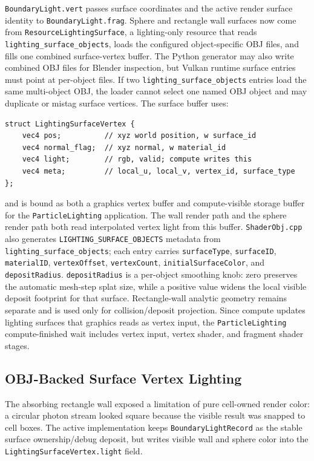 \texttt{BoundaryLight.vert} passes surface coordinates and the active render
surface identity to \texttt{BoundaryLight.frag}.  Sphere and rectangle wall
surfaces now come from \texttt{ResourceLightingSurface}, a lighting-only
resource that reads \texttt{lighting\_surface\_objects}, loads the configured
object-specific OBJ files, and fills one combined surface-vertex buffer.  The
Python generator may also write combined OBJ files for Blender inspection, but
Vulkan runtime surface entries must point at per-object files.  If two
\texttt{lighting\_surface\_objects} entries load the same multi-object OBJ,
the loader cannot select one named OBJ object and may duplicate or mistag
surface vertices.  The surface buffer uses:
\begin{verbatim}
struct LightingSurfaceVertex {
    vec4 pos;          // xyz world position, w surface_id
    vec4 normal_flag;  // xyz normal, w material_id
    vec4 light;        // rgb, valid; compute writes this
    vec4 meta;         // local_u, local_v, vertex_id, surface_type
};
\end{verbatim}
and is bound as both a graphics vertex buffer and compute-visible storage
buffer for the \texttt{ParticleLighting} application.  The wall render path
and the sphere render path both read interpolated vertex light from this
buffer.  \texttt{ShaderObj.cpp} also generates
\texttt{LIGHTING\_SURFACE\_OBJECTS} metadata from
\texttt{lighting\_surface\_objects}; each entry carries
\texttt{surfaceType}, \texttt{surfaceID}, \texttt{materialID},
\texttt{vertexOffset}, \texttt{vertexCount},
\texttt{initialSurfaceColor}, and \texttt{depositRadius}.
\texttt{depositRadius} is a per-object smoothing knob: zero preserves the
automatic mesh-step splat size, while a positive value widens the local
visible deposit footprint for that surface.  Rectangle-wall analytic geometry
remains separate and is used only for collision/deposit projection.
Since compute updates lighting surfaces that graphics reads as vertex input,
the \texttt{ParticleLighting} compute-finished wait includes vertex input,
vertex shader, and fragment shader stages.

\subsection{OBJ-Backed Surface Vertex Lighting}

The absorbing rectangle wall exposed a limitation of pure cell-owned render
color: a circular photon stream looked square because the visible result was
snapped to cell boxes.  The active implementation keeps
\texttt{BoundaryLightRecord} as the stable surface ownership/debug deposit,
but writes visible wall and sphere color into the
\texttt{LightingSurfaceVertex.light} field.

